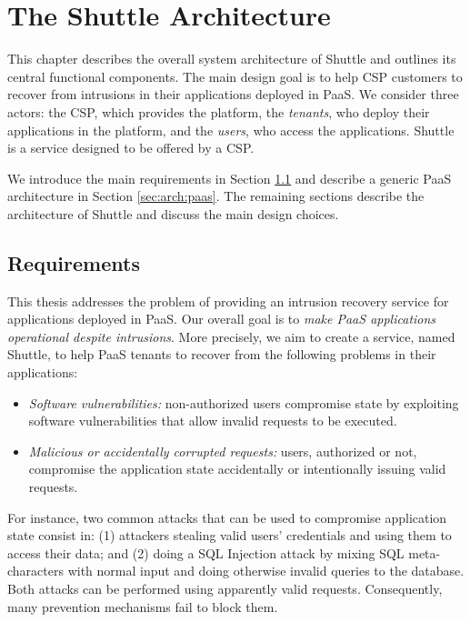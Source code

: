 
\chapter{The Shuttle Architecture}
\label{chapter:architecture}
This chapter describes the overall system architecture of Shuttle and outlines its central functional components. The main design goal is to help \ac{CSP} customers to recover from intrusions in their applications deployed in \ac{PaaS}. We consider three actors: the \ac{CSP}, which provides the platform, the \emph{tenants}, who deploy their applications in the platform, and the \emph{users}, who access the applications. Shuttle is a service designed to be offered by a \ac{CSP}.

We introduce the main requirements in Section \ref{sec:arch:requirements} and describe a generic \ac{PaaS} architecture in Section \ref{sec:arch:paas}. The remaining sections describe the architecture of Shuttle and discuss the main design choices.

\section{Requirements}
\label{sec:arch:requirements}
This thesis addresses the problem of providing an intrusion recovery service for applications deployed in \ac{PaaS}. Our overall goal is to \textit{make \ac{PaaS} applications operational despite intrusions}. More precisely, we aim to create a service, named Shuttle, to help \ac{PaaS} tenants to recover from the following problems in their applications:
\begin{itemize}
\item \textit{Software vulnerabilities:} non-authorized users compromise state by exploiting software vulnerabilities that allow invalid requests to be executed.
\item \textit{Malicious or accidentally corrupted requests:} users, authorized or not, compromise the application state accidentally or intentionally issuing valid requests.
\end{itemize} 




For instance, two common attacks that can be used to compromise application state consist in: (1) attackers stealing valid users' credentials and using them to access their data; and (2) doing a \ac{SQL} Injection attack by mixing \ac{SQL} meta-characters with normal input and doing otherwise invalid queries to the database. Both attacks can be performed using apparently valid requests. Consequently, many prevention mechanisms fail to block them.

